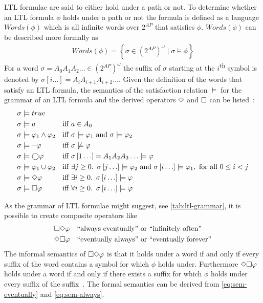 LTL formulae are said to either hold under a path or not. To determine whether an LTL formula $\phi$ holds under a path or not the formula is defined as a language $\mathit{Words}(\phi)$ which is all infinite words over $2^{AP}$ that satisfies $\phi$. $\mathit{Words}(\phi)$ can be described more formally as~\cite[Def.~5.6]{baier2008principles}
\begin{align*}
    \mathit{Words}(\phi) = \left\{ \sigma \in \left( 2^{AP} \right)^\omega \mid \sigma \models \phi \right\}
\end{align*}
For a word $\sigma = A_0 A_1 A_2 \ldots \in \left( 2^{AP} \right)^\omega$ the suffix of $\sigma$ starting at the $i$\textsuperscript{th} symbol is denoted by $\sigma \left[ i \ldots \right] = A_i A_{i+1} A_{i+2} \ldots$. Given the definition of the words that satisfy an LTL formula, the semantics of the satisfaction relation $\models$ for the grammar of an LTL formula and the derived operators $\Diamond$ and $\square$ can be listed~\cite[Fig.~5.2]{baier2008principles}:
\begin{align}
    \sigma &\models true                && \label{eq:sem-true}\\
    \sigma &\models a                   &\text{iff }& a \in A_0 \\
    \sigma &\models \varphi_1 \land \varphi_2 &\text{iff }& \sigma \models \varphi_1 \text{ and } \sigma \models \varphi_2 \\
    \sigma &\models \lnot \varphi          &\text{iff }& \sigma \not\models \varphi\\
    \sigma &\models \bigcirc \varphi             &\text{iff }& \sigma\left[1\ldots\right] = A_1 A_2 A_3\ldots \models \varphi\\
    \sigma &\models \varphi_1 \cup \varphi_2    &\text{iff }& \exists j \geq 0.\enskip \sigma\left[j\ldots\right] \models \varphi_2 \text{ and } \sigma\left[i\ldots\right] \models \varphi_1, \text{ for all } 0 \leq i < j \\
    \sigma &\models \Diamond \varphi             &\text{iff }& \exists i \geq 0.\enskip \sigma\left[i\ldots\right] \models \varphi \label{eq:sem-eventually} \\ 
    \sigma &\models \square \varphi             &\text{iff }& \forall i \geq 0.\enskip \sigma\left[i\ldots\right] \models \varphi \label{eq:sem-always}
\end{align}

As the grammar of LTL formulae might suggest, see \autoref{tab:ltl-grammar}, it is possible to create composite operators like
\begin{align*}
    &\square\Diamond\varphi \quad \text{``always eventually'' or ``infinitely often''}\\
    &\Diamond\square\varphi \quad \text{``eventually always'' or ``eventually forever''}
\end{align*}
The informal semantics of $\square\Diamond\varphi$ is that it holds under a word if and only if every suffix of the word contains a symbol for which $\phi$ holds under. Furthermore $\Diamond\square\varphi$ holds under a word if and only if there exists a suffix for which $\phi$ holds under every suffix of the suffix~\cite{baier2008principles}. The formal semantics can be derived from \autoref{eq:sem-eventually} and \autoref{eq:sem-always}.

